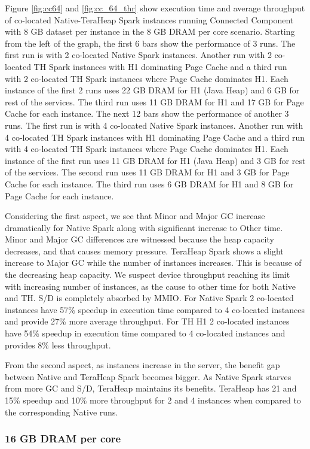 Figure \ref{fig:cc64} and \ref{fig:cc_64_thr} show execution time and average throughput of co-located
Native-TeraHeap Spark instances running Connected Component with 8 GB
dataset per instance in the 8 GB DRAM per core scenario.
Starting from the left of the graph, the first 6 bars show the
performance of 3 runs. The first run is with 2 co-located Native Spark instances.
Another run with 2 co-located TH Spark instances with H1 dominating Page Cache
and a third run with 2 co-located TH Spark instances where Page Cache dominates H1.
Each instance of the first 2 runs uses 22 GB DRAM for H1 (Java Heap) and 6 GB for rest of the services.
The third run uses 11 GB DRAM for H1 and 17 GB for Page Cache for each instance. 
The next 12 bars show the performance of another 3 runs. The first run is with 4 co-located Native Spark instances.
Another run with 4 co-located TH Spark instances with H1 dominating Page Cache
and a third run with 4 co-located TH Spark instances where Page Cache dominates H1.
Each instance of the first run uses 11 GB DRAM for H1 (Java Heap) and 3 GB for rest of the services.
The second run uses 11 GB DRAM for H1 and 3 GB for Page Cache for each instance.
The third run uses 6 GB DRAM for H1 and 8 GB for Page Cache for each instance.

Considering the first aspect, we see that Minor and Major GC increase dramatically for Native Spark along with significant increase to Other time. Minor and Major GC differences are witnessed because the heap capacity decreases, and that causes memory pressure. TeraHeap Spark shows a slight increase to Major GC while the number of instances increases. This is because of the decreasing heap capacity. We suspect device throughput reaching its limit with increasing number of instances, as the cause to other time for both Native and TH. S/D is completely absorbed by MMIO. For Native Spark 2 co-located instances have 57\% speedup in execution time compared to 4 co-located instances and provide 27\% more average throughput. For TH H1 2 co-located instances have 54\% speedup in execution time compared to 4 co-located instances and provides 8\% less throughput.

From the second aspect, as instances increase in the server, the benefit gap between Native and TeraHeap Spark becomes bigger. As Native Spark starves from more GC and S/D, TeraHeap maintains its benefits. TeraHeap has 21 and 15\% speedup and 10\% more throughput for 2 and 4 instances when compared to the corresponding Native runs.

\subsubsection{16 GB DRAM per core}

